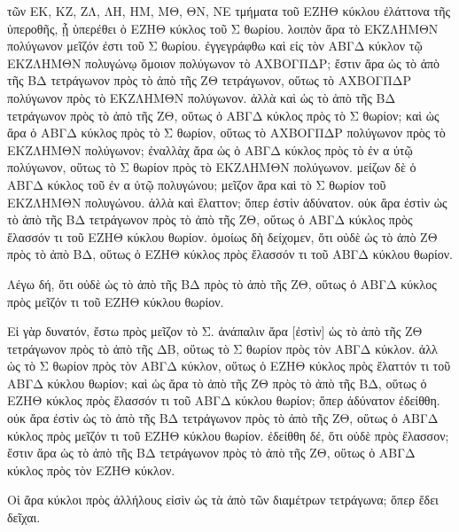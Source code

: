 \begin{Parallel}{}{}
{{τῶν ΕΚ, ΚΖ, ΖΛ, ΛΗ, ΗΜ, ΜΘ, ΘΝ, ΝΕ τμήματα τοῦ ΕΖΗΘ κύκλου ἐλάττονα
τῆς ὑπεροθῆς, ᾗ ὑπερέθει ὁ ΕΖΗΘ κύκλος τοῦ Σ θωρίου. λοιπὸν ἄρα τὸ ΕΚΖΛΗΜΘΝ πολύγωνον
μεῖζόν ἐστι τοῦ Σ θωρίου.
 ἐγγεγράφθω καὶ εἰς τὸν ΑΒΓΔ κύκλον τῷ ΕΚΖΛΗΜΘΝ
πολυγώνῳ ὅμοιον πολύγωνον τὸ ΑΧΒΟΓΠΔΡ; ἔστιν ἄρα ὡς τὸ ἀπὸ
τῆς ΒΔ τετράγωνον πρὸς τὸ ἀπὸ τῆς ΖΘ τετράγωνον, οὕτως τὸ
ΑΧΒΟΓΠΔΡ πολύγωνον πρὸς τὸ ΕΚΖΛΗΜΘΝ πολύγωνον. ἀλλὰ καὶ ὡς  τὸ ἀπὸ τῆς ΒΔ τετράγωνον πρὸς τὸ ἀπὸ τῆς
ΖΘ, οὕτως ὁ ΑΒΓΔ κύκλος πρὸς τὸ Σ θωρίον; καὶ ὡς ἄρα ὁ ΑΒΓΔ κύκλος
πρὸς τὸ Σ θωρίον, οὕτως τὸ ΑΧΒΟΓΠΔΡ πολύγωνον πρὸς τὸ ΕΚΖΛΗΜΘΝ
πολύγωνον; ἐναλλὰχ ἄρα ὡς ὁ ΑΒΓΔ κύκλος πρὸς τὸ ἐν α ὐτῷ πολύγωνον, οὕτως τὸ Σ θωρίον πρὸς τὸ ΕΚΖΛΗΜΘΝ πολύγωνον.  μείζων δὲ ὁ ΑΒΓΔ κύκλος τοῦ ἐν α ὐτῷ πολυγώνου; μεῖζον ἄρα καὶ τὸ Σ θωρίον τοῦ ΕΚΖΛΗΜΘΝ πολυγώνου. ἀλλὰ
καὶ ἔλαττον; ὅπερ ἐστὶν ἀδύνατον. οὐκ ἄρα ἐστὶν ὡς τὸ ἀπὸ τῆς ΒΔ τετράγωνον πρὸς τὸ ἀπὸ τῆς ΖΘ, οὕτως ὁ ΑΒΓΔ κύκλος πρὸς ἔλασσόν τι τοῦ ΕΖΗΘ κύκλου θωρίον. ὁμοίως δὴ δείχομεν, ὅτι οὐδὲ ὡς τὸ ἀπὸ ΖΘ πρὸς
τὸ ἀπὸ ΒΔ, οὕτως ὁ ΕΖΗΘ κύκλος πρὸς ἔλασσόν τι τοῦ ΑΒΓΔ κύκλου θωρίον.}

{\greekfont Λέγω δή, ὅτι οὐδὲ ὡς τὸ ἀπὸ τῆς ΒΔ πρὸς τὸ ἀπὸ τῆς ΖΘ, οὕτως
ὁ ΑΒΓΔ κύκλος πρὸς μεῖζόν τι τοῦ ΕΖΗΘ κύκλου θωρίον.}

{\greekfont Εἰ γὰρ δυνατόν, ἔστω πρὸς μεῖζον τὸ Σ. ἀνάπαλιν ἄρα [ἐστὶν]
ὡς τὸ ἀπὸ τῆς ΖΘ τετράγωνον πρὸς τὸ ἀπὸ τῆς ΔΒ, οὕτως τὸ Σ
θωρίον πρὸς τὸν ΑΒΓΔ κύκλον. ἀλλ ὡς τὸ Σ θωρίον πρὸς τὸν ΑΒΓΔ
κύκλον, οὕτως ὁ ΕΖΗΘ κύκλος πρὸς ἔλαττόν τι τοῦ ΑΒΓΔ κύκλου θωρίον; καὶ
ὡς ἄρα τὸ ἀπὸ τῆς ΖΘ πρὸς τὸ ἀπὸ τῆς ΒΔ, οὕτως ὁ ΕΖΗΘ κύκλος
πρὸς ἔλασσόν τι τοῦ ΑΒΓΔ κύκλου θωρίον; ὅπερ ἀδύνατον ἐδείθθη. οὐκ
ἄρα ἐστὶν ὡς τὸ ἀπὸ τῆς ΒΔ τετράγωνον πρὸς τὸ ἀπὸ τῆς ΖΘ, οὕτως
ὁ ΑΒΓΔ κύκλος πρὸς μεῖζόν τι τοῦ ΕΖΗΘ κύκλου θωρίον. ἐδείθθη
δέ, ὅτι οὐδὲ πρὸς ἔλασσον; ἔστιν ἄρα ὡς τὸ ἀπὸ τῆς ΒΔ τετράγωνον
πρὸς τὸ ἀπὸ τῆς ΖΘ, οὕτως ὁ ΑΒΓΔ κύκλος πρὸς τὸν ΕΖΗΘ κύκλον.}

{\greekfont Οἱ ἄρα κύκλοι πρὸς ἀλλήλους εἰσὶν ὡς τὰ ἀπὸ τῶν διαμέτρων τετράγωνα;
ὅπερ ἔδει δεῖχαι.}}

\end{Parallel}
